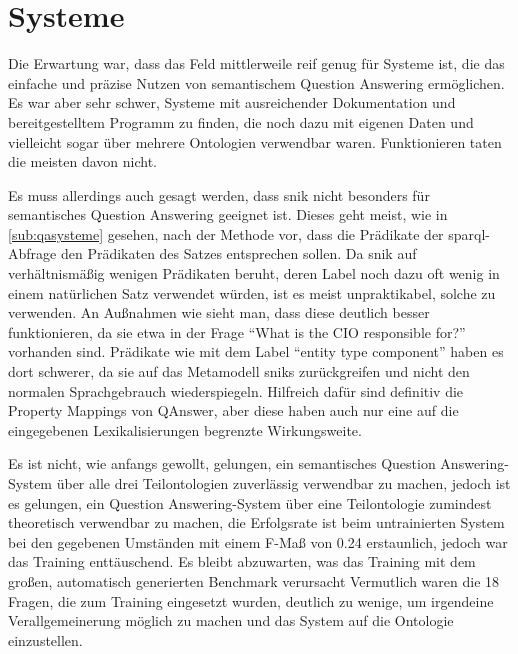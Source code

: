 \section{Systeme}

Die Erwartung war, dass das Feld mittlerweile reif genug für Systeme ist, die das einfache und präzise Nutzen von semantischem Question Answering ermöglichen.
Es war aber sehr schwer, Systeme mit ausreichender Dokumentation und bereitgestelltem Programm zu finden, die noch dazu mit eigenen Daten und vielleicht sogar über mehrere Ontologien verwendbar waren.
Funktionieren taten die meisten davon nicht.

Es muss allerdings auch gesagt werden, dass \ac{snik} nicht besonders für semantisches Question Answering geeignet ist.
Dieses geht meist, wie in \cref{sub:qasysteme} gesehen, nach der Methode vor, dass die Prädikate der \ac{sparql}-Abfrage den Prädikaten des Satzes entsprechen sollen.
Da \ac{snik} auf verhältnismäßig wenigen Prädikaten beruht, deren Label noch dazu oft wenig in einem natürlichen Satz verwendet würden, ist es meist unpraktikabel, solche zu verwenden.
An Außnahmen wie  sieht man, dass diese deutlich besser funktionieren, da sie etwa in der Frage \enquote{What is the CIO responsible for?} vorhanden sind.
Prädikate wie  mit dem Label \enquote{entity type component} haben es dort schwerer, da sie auf das Metamodell \ac{snik}s zurückgreifen
und nicht den normalen Sprachgebrauch wiederspiegeln.
Hilfreich dafür sind definitiv die Property Mappings von QAnswer, aber diese haben auch nur eine auf die eingegebenen Lexikalisierungen begrenzte Wirkungsweite.

Es ist nicht, wie anfangs gewollt, gelungen, ein semantisches Question Answering-System über alle drei Teilontologien zuverlässig verwendbar zu machen,
jedoch ist es gelungen, ein Question Answering-System über eine Teilontologie zumindest theoretisch verwendbar zu machen, die Erfolgsrate ist beim untrainierten System bei den gegebenen Umständen mit einem F-Maß von 0.24 erstaunlich, jedoch war das Training enttäuschend.
Es bleibt abzuwarten, was das Training mit dem großen, automatisch generierten Benchmark verursacht
Vermutlich waren die 18 Fragen, die zum Training eingesetzt wurden, deutlich zu wenige, um irgendeine Verallgemeinerung möglich zu machen und das System auf die Ontologie einzustellen.

